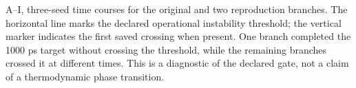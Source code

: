 A--I, three-seed time courses for the original and two reproduction branches. The horizontal line marks the declared operational instability threshold; the vertical marker indicates the first saved crossing when present. One branch completed the 1000 ps target without crossing the threshold, while the remaining branches crossed it at different times. This is a diagnostic of the declared gate, not a claim of a thermodynamic phase transition.
